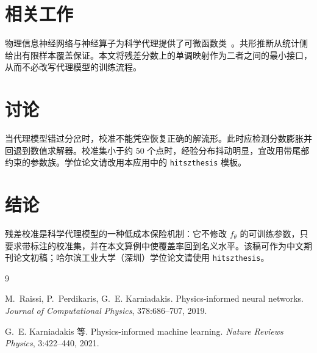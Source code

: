 \documentclass[UTF8,a4paper,11pt]{ctexart}
\begin{document}
\section{相关工作}

物理信息神经网络与神经算子为科学代理提供了可微函数类~\cite{raissi2019,karniadakis2021}。共形推断从统计侧给出有限样本覆盖保证。本文将残差分数上的单调映射作为二者之间的最小接口，从而不必改写代理模型的训练流程。

\section{讨论}

当代理模型错过分岔时，校准不能凭空恢复正确的解流形。此时应检测分数膨胀并回退到数值求解器。校准集小于约 50 个点时，经验分布抖动明显，宜改用带尾部约束的参数族。学位论文请改用本应用中的 \texttt{hitszthesis} 模板。

\section{结论}

残差校准是科学代理模型的一种低成本保险机制：它不修改 $f_\theta$ 的可训练参数，只要求带标注的校准集，并在本文算例中使覆盖率回到名义水平。该稿可作为中文期刊论文初稿；哈尔滨工业大学（深圳）学位论文请使用 \texttt{hitszthesis}。

\begin{thebibliography}{9}

M.~Raissi, P.~Perdikaris, G.~E. Karniadakis.
Physics-informed neural networks.
\textit{Journal of Computational Physics}, 378:686--707, 2019.

G.~E. Karniadakis 等.
Physics-informed machine learning.
\textit{Nature Reviews Physics}, 3:422--440, 2021.

\end{thebibliography}
\end{document}
